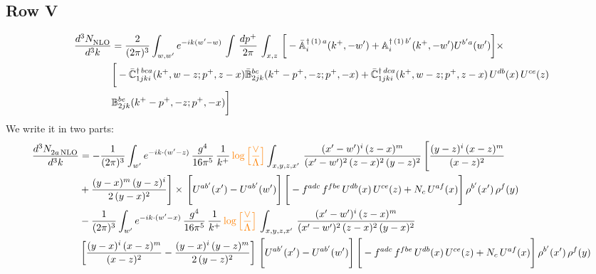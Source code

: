 \documentclass[9pt]{article}
\def\mf#1{\mathbb{#1}}
\numberwithin{equation}{section}
\begin{document}
\subsection{{\color{red}Row V}}
\begin{align}
    \frac{d^{3}N_{\rm NLO}^{\rm}}{d^{3}k}  & = \frac{2}{(2\pi)^{3}}  \int_{w, w^\prime} e^{-ik(w^\prime-w)}\, \int\, \frac{dp^{+}}{2\pi}\,\int_{x,z}\, \bigg[-\bar{\mf{A}}^{\dagger\,(1)\,a}_{i}(k^{+},-w^{\prime})+\mf{A}^{\dagger\, (1)\, b^{\prime}}_{i}(k^{+},-w^{\prime})U^{b^{\prime}a}(w^{\prime})\bigg]\times\notag \\ & \bigg[-\Bar{\mf{C}}^{\dagger\, bca}_{1jki}(k^{+},w-z;p^{+},z-x)\Bar{\mf{B}}^{bc}_{2jk}(k^{+}-p^{+},- z;p^{+},-x)+\bar{\mf{C}}^{\dagger\, dca}_{1jki}(k^+,w-z; p^+, z-x)\,U^{db}(x)\,U^{ce}(z) \notag \\ & {\mf{B}}^{be}_{2jk} (k^{+}-p^+, -z; p^+, -x) \bigg]\nonumber
\end{align}
We write it in two parts: 
\begin{align}
    \frac{d^{3}N_{2a\,\rm NLO}^{\rm}}{d^{3}k}  & =- \frac{1}{(2\pi)^{3}}  \int_{w^\prime} e^{-ik\cdot(w'-z)}\, \frac{g^{4}}{16\pi^{5}}\,\frac{1}{k^{+}}\,{\color{orange}\log{\left[\frac{\vee}{\Lambda}\right]}} \int_{x,y,z,x'}\, \frac{(x'-w')^{i}\,(z-x)^{m}}{(x'-w')^{2}\,(z-x)^{2}\, (y-z)^{2}}\,\Bigg[\frac{(y-z)^{i}\,(x-z)^{m}}{(x-z)^{2}}\notag \\ & +\frac{(y-x)^{m}\,(y-z)^{i}}{2\,(y-x)^{2}}\Bigg]\times\, \Bigg[U^{ab'}(x')-U^{ab'}(w')\Bigg]\,\Bigg[-f^{adc}\,f^{fbe}\,U^{db}(x)\,U^{ce}(z)+N_{c}\,U^{af}(x)\Bigg]\,\rho^{b'}(x')\,\rho^{f}(y)\notag \\ & - \frac{1}{(2\pi)^{3}}  \int_{w^\prime} e^{-ik\cdot(w'-x)}\, \frac{g^{4}}{16\pi^{5}}\,\frac{1}{k^{+}}\,{\color{orange}\log{\left[\frac{\vee}{\Lambda}\right]}}\, \int_{x,y,z,x'}\,\frac{(x'-w')^{i}\,(z-x)^{m}}{(x'-w')^{2}\,(z-x)^{2}\,(y-x)^{2}} \notag \\ &\left[\frac{(y-x)^{i}\,(x-z)^{m}}{(x-z)^{2}}-\frac{(y-x)^{i}\,(y-z)^{m}}{2\,(y-z)^{2}}\right]\, \Bigg[U^{ab'}(x')-U^{ab'}(w')\Bigg]\,\Bigg[-f^{adc}\,f^{fbe}\,U^{db}(x)\,U^{ce}(z)+N_{c}\,U^{af}(x)\Bigg]\,\rho^{b'}(x')\,\rho^{f}(y)
\end{align}
\end{document}
